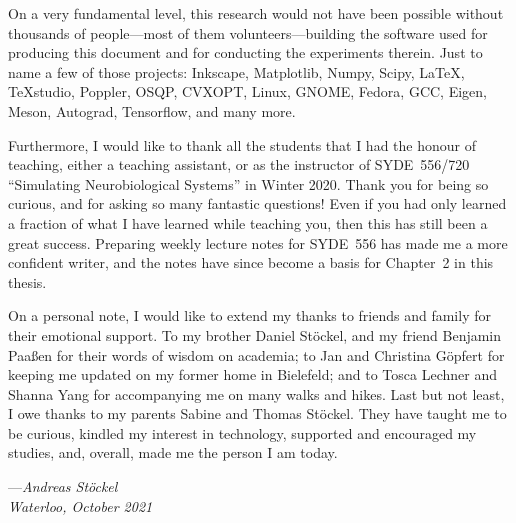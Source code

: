 On a very fundamental level, this research would not have been possible without thousands of people---most of them volunteers---building the software used for producing this document and for conducting the experiments therein. Just to name a few of those projects: Inkscape, Matplotlib, Numpy, Scipy, \LaTeX, \TeX studio, Poppler, OSQP, CVXOPT, Linux, GNOME, Fedora, GCC, Eigen, Meson, Autograd, Tensorflow, and many more.

Furthermore, I would like to thank all the students that I had the honour of teaching, either a teaching assistant, or as the instructor of SYDE~556/720 \enquote{Simulating Neurobiological Systems} in Winter 2020.
Thank you for being so curious, and for asking so many fantastic questions!
Even if you had only learned a fraction of what I have learned while teaching you, then this has still been a great success.
Preparing weekly lecture notes for SYDE~556 has made me a more confident writer, and the notes have since become a basis for Chapter~2 in this thesis.

On a personal note, I would like to extend my thanks to friends and family for their emotional support.
To my brother Daniel Stöckel, and my friend Benjamin Paaßen for their words of wisdom on academia; to Jan and Christina Göpfert for keeping me updated on my former home in Bielefeld; and to Tosca Lechner and Shanna Yang for accompanying me on many walks and hikes.
Last but not least, I owe thanks to my parents Sabine and Thomas Stöckel.
They have taught me to be curious, kindled my interest in technology, supported and encouraged my studies, and, overall, made me the person I am today.

\bigskip

{
\raggedleft
---\emph{Andreas Stöckel\\Waterloo, October 2021}\\
}
